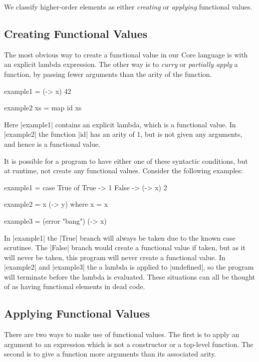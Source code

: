 \documentclass[preprint]{sigplanconf}
\begin{document}
We classify higher-order elements as either \textit{creating} or \textit{applying} functional values.

\subsection{Creating Functional Values}

The most obvious way to create a functional value in our Core language is with an explicit lambda expression. The other way is to \textit{curry} or \textit{partially apply} a function, by passing fewer arguments than the arity of the function.

\begin{example}
\begin{code}
example1 = (\x -> x) 42

example2 xs = map id xs
\end{code}

Here |example1| contains an explicit lambda, which is a functional value. In |example2| the function |id| has an arity of 1, but is not given any arguments, and hence is a functional value.
\end{example}

It is possible for a program to have either one of these syntactic conditions, but at runtime, not create any functional values. Consider the following examples:

\begin{code}
example1 = case  True of
                 True   -> 1
                 False  -> (\x -> x) 2

example2 = x (\y -> y)
    where x = x

example3 = (error "bang") (\x -> x)
\end{code}

In |example1| the |True| branch will always be taken due to the known case scrutinee. The |False| branch would create a functional value if taken, but as it will never be taken, this program will never create a functional value. In |example2| and |example3| the a lambda is applied to |undefined|, so the program will terminate before the lambda is evaluated. These situations can all be thought of as having functional elements in dead code.


\subsection{Applying Functional Values}

There are two ways to make use of functional values. The first is to apply an argument to an expression which is not a constructor or a top-level function. The second is to give a function more arguments than its associated arity.
\end{document}
